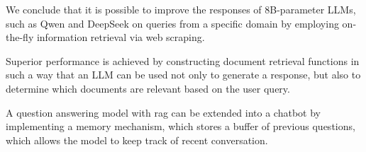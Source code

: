 \documentclass[fleqn,moreauthors,10pt]{ds_report}
\begin{document}
We conclude that it is possible to improve the responses of 8B-parameter LLMs, such as Qwen and DeepSeek on queries from a specific domain by employing on-the-fly information retrieval via web scraping. 

Superior performance is achieved by constructing document retrieval functions in such a way that an LLM can be used not only to generate a response, but also to determine which documents are relevant based on the user query. 

A question answering model with \ac{rag} can be extended into a chatbot by implementing a memory mechanism, which stores a buffer of previous questions, which allows the model to keep track of recent conversation.





\end{document}
